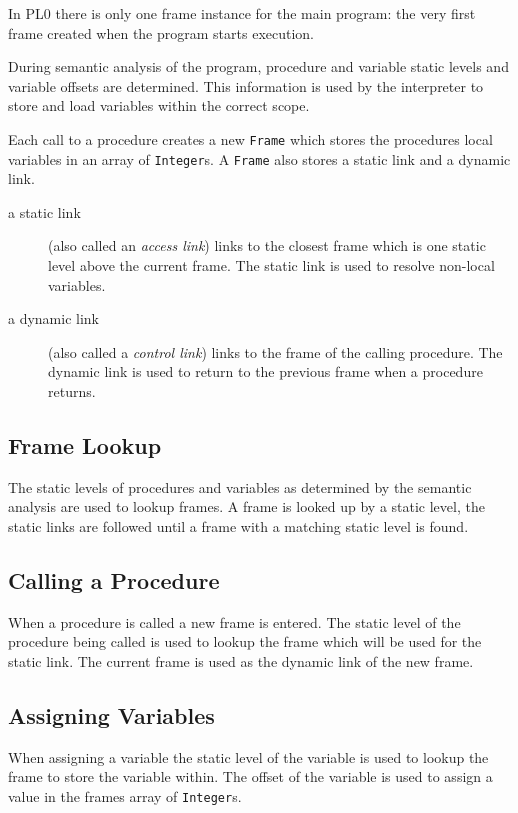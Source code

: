 \documentclass[a4paper,twoside,twocolumn]{article}
\begin{document}
In PL0 there is only one frame instance for the main program:
the very first frame created when the program starts execution.


During semantic analysis of the program, procedure and variable static levels
and variable offsets are determined.
This information is used by the interpreter to store and load variables within
the correct scope.

Each call to a procedure creates a new \texttt{Frame} which stores the procedures
local variables in an array of \texttt{Integer}s. A \texttt{Frame} also stores
a static link and a dynamic link.

\begin{description}
\item[a static link] (also called an \emph{access link}) links to the closest
frame which is one static level above the current frame. The static link
is used to resolve non-local variables.

\item[a dynamic link] (also called a \emph{control link}) links to the frame
of the calling procedure. The dynamic link is used to return to the previous
frame when a procedure returns.
\end{description}

\subsection{Frame Lookup}\label{section:lookup}
The static levels of procedures and variables as determined by the semantic
analysis are used to lookup frames. A frame is looked up by a static level,
the static links are followed until a frame with a matching static level is
found.

\subsection{Calling a Procedure}\label{section:call}
When a procedure is called a new frame is entered. The static level of the
procedure being called is used to lookup the frame which will be used for the
static link. The current frame is used as the dynamic link of the new frame.

\subsection{Assigning Variables}\label{section:assignment}
When assigning a variable the static level of the variable is used to lookup
the frame to store the variable within. The offset of the variable is used
to assign a value in the frames array of \texttt{Integer}s.
\end{document}

